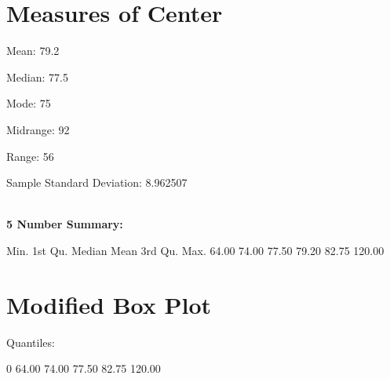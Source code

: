 \documentclass[twocolumn,english]{IEEEtran}
\theoremstyle{plain}
\theoremstyle{plain}
\begin{document}
\section{Measures of Center}
\begin{Schunk}
\begin{Soutput}
Mean:  79.2
\end{Soutput}
\begin{Soutput}
Median:  77.5
\end{Soutput}
\begin{Soutput}
Mode:  75
\end{Soutput}
\begin{Soutput}
Midrange:  92
\end{Soutput}
\begin{Soutput}
Range:  56
\end{Soutput}
\begin{Soutput}
Sample Standard Deviation:  8.962507
\end{Soutput}
\end{Schunk}

\noindent \hrulefill\\
\noindent \textbf{5 Number Summary:}
\begin{Schunk}
\begin{Soutput}
   Min. 1st Qu.  Median    Mean 3rd Qu.    Max. 
  64.00   74.00   77.50   79.20   82.75  120.00 
\end{Soutput}
\end{Schunk}
\noindent \hrulefill

\section{Modified Box Plot}
Quantiles:
\begin{Schunk}
\begin{Soutput}
    0%
 64.00  74.00  77.50  82.75 120.00 
\end{Soutput}
\end{Schunk}
\end{document}
